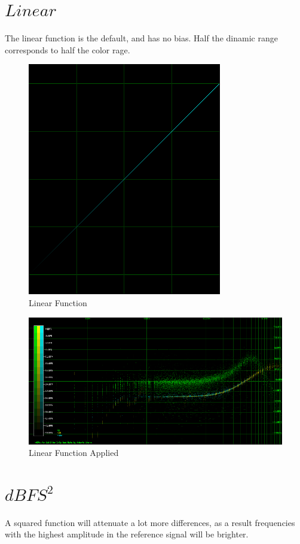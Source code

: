 \documentclass[10pt,a4paper]{report}
\begin{document}
\begin{appendices}
\newpage
\section{$Linear$} 

The linear function is the default, and has no bias. Half the dinamic range corresponds to half the color rage.

\begin{figure}[H]
	\centering
	\includegraphics[width=0.4\linewidth]{plots/BetaFunctionPlot_3.png}
	\caption[Linear]{Linear Function}
	\label{fig:betafunctionplot3}
\end{figure}

\begin{figure}[H]
	\centering
	\includegraphics[width=1\linewidth]{plots/BetaFunctionPlot_3_Data.png}
	\caption[Linear Applied]{Linear Function Applied}
	\label{fig:betafunctionplot3data}
\end{figure}

\newpage
\section{$dBFS^2$}

A squared function will attenuate a lot more differences, as a result frequencies with the highest amplitude in the reference signal will be brighter.


\end{appendices}
\end{document}

